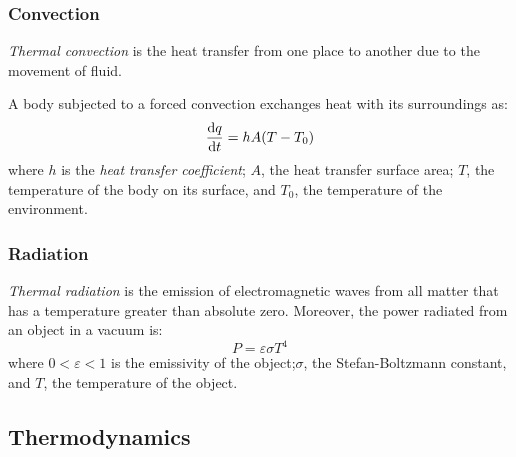 \documentclass[../../../main.tex]{subfiles}
\begin{document}
\begin{multicols}{2}
  \subsubsection*{Convection}
  \begin{definition}[Convection]
    \textit{Thermal convection} is the heat transfer from one place to another due to the movement of fluid.
  \end{definition}
  \begin{prop}
    A body subjected to a forced convection exchanges heat with its surroundings as: $$\dv{q}{t}=hA(T-T_0)$$ where $h$ is the \textit{heat transfer coefficient}; $A$, the heat transfer surface area; $T$, the temperature of the body on its surface, and $T_0$, the temperature of the environment.
  \end{prop}
  \subsubsection*{Radiation}
  \begin{definition}[Radiation]
    \textit{Thermal radiation} is the emission of electromagnetic waves from all matter that has a temperature greater than absolute zero. Moreover, the power radiated from an object in a vacuum is: $$P=\varepsilon\sigma T^4$$ where $0<\varepsilon<1$ is the emissivity of the object;$\sigma$, the Stefan-Boltzmann constant, and $T$, the temperature of the object.
  \end{definition}
  \subsection{Thermodynamics}

\end{multicols}
\end{document}
